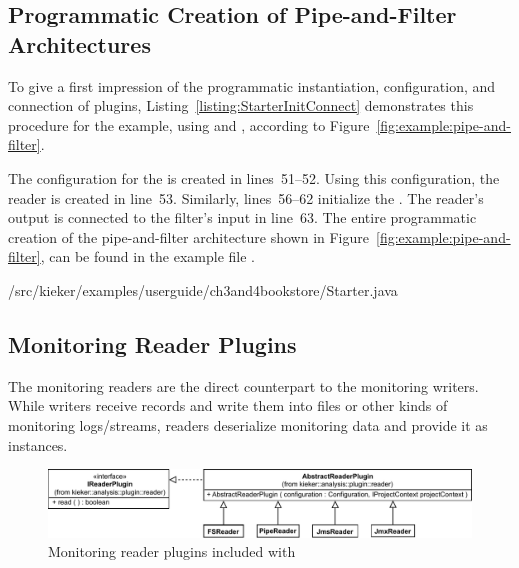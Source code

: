\subsection{Programmatic Creation of Pipe-and-Filter Architectures}\label{sec:analysis:programmaticCreation}

To give a first impression of the programmatic %
instantiation, configuration, and connection of plugins, Listing~\ref{listing:StarterInitConnect} %
demonstrates this procedure for the example, using  and %
, according to Figure~\ref{fig:example:pipe-and-filter}.

The configuration for the  is created in lines~51--52. %
Using this configuration, the reader is created in line~53. Similarly, %
lines~56--62 initialize the . The reader's output is connected %
to the filter's input in line~63. %
The entire programmatic creation of the pipe-and-filter architecture shown %
in Figure~\ref{fig:example:pipe-and-filter}, can be found in the example  %
file .

\medskip

\setJavaCodeListing
%
{\customComponentsBookstoreApplicationDir/src/kieker/examples/userguide/ch3and4bookstore/Starter.java}

\enlargethispage{0.5cm}

\subsection{Monitoring Reader Plugins}

The monitoring readers are the direct counterpart to the monitoring %
writers. While writers receive records and write them into files or other kinds %
of monitoring logs/streams, readers deserialize monitoring data and provide it as %
 instances.

\begin{figure}\centering
\includegraphics[scale=0.7]{images/kieker_readerimplsuserguide-modified}
\caption{Monitoring reader plugins included with \Kieker{}}
\label{Figure:ReaderHierarchy}
\end{figure}

